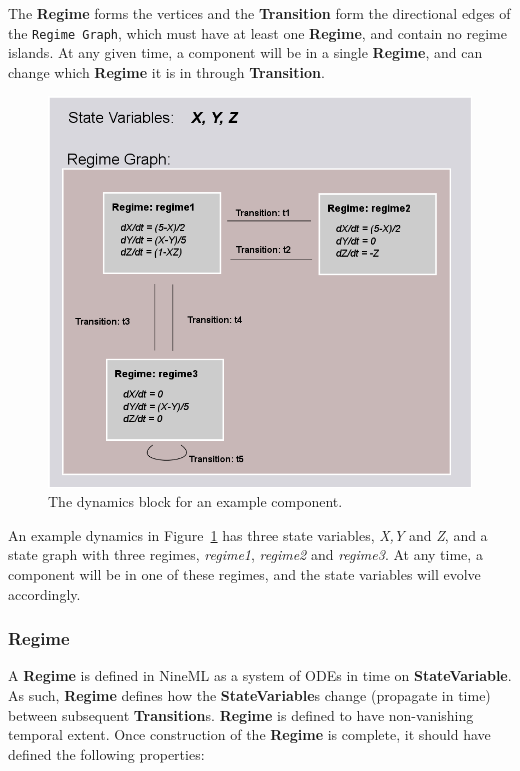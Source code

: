 \documentclass{article}
\newcommand{\nmlClass}[1]{{\bf #1}}
\newcommand{\StateVariable}{{\bf{StateVariable}}\xspace}
\newcommand{\StateVariables}{{\bf{StateVariable}}s\xspace}
\newcommand{\Regime}{{\bf{Regime}}\xspace}
\newcommand{\Transition}{{\bf{Transition}}\xspace}
\newcommand{\Transitions}{{\bf{Transition}}s\xspace}
\begin{document}
The \Regime forms the vertices and the \Transition form the
directional edges of the {\tt Regime Graph}, which must have at least
one \Regime, and contain no regime islands.  At any given time, a
component will be in a single \Regime, and can change which \Regime it is in through \Transition.

\begin{figure}[htb!]
\center
\includegraphics[width=14cm]{images/SimpleRegimeGraph.png}
\protect\caption{The dynamics block for an example component.}
\label{SimpleRegimeGraph}
\end{figure}

An example dynamics in Figure~\ref{SimpleRegimeGraph} has three state variables,
\emph{X,Y} and \emph{Z}, and a state graph with three regimes, \emph{regime1},
\emph{regime2} and \emph{regime3}. At any time, a component will be in one of
these regimes, and the state variables will evolve accordingly.

\subsubsection{Regime}

A \nmlClass{Regime} is defined in NineML as a system of ODEs in time
on \StateVariable.  As such, \Regime defines how the \StateVariables change (propagate in time) between subsequent \Transitions. \Regime is defined to have non-vanishing
temporal extent. Once construction of the \Regime is complete, it
should have defined the following properties:
\end{document}
